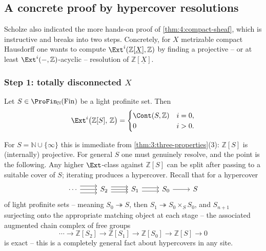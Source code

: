 \subsection{A concrete proof by hypercover resolutions}

Scholze also indicated the more hands-on proof of \cref{thm:4:compact-sheaf},
which is instructive and breaks into two steps. Concretely, for $X$ metrizable
compact Hausdorff one wants to compute $\Ext^{i}(\mathbb{Z}[\underline{X}],
\mathbb{Z})$ by finding a projective -- or at least $\Ext^i(-,\mathbb{Z})$-acyclic
-- resolution of $\mathbb{Z}[\underline{X}]$.

\subsubsection*{Step 1: totally disconnected \texorpdfstring{$X$}{X}}

\begin{proposition}
\label{prop:4:profinite-acyclic}
Let $S\in\ProFin_{\mathbb{N}}(\mathrm{Fin})$ be a light profinite set. Then
\begin{equation*}
\Ext^{i}\bigl(\mathbb{Z}[S],\,\mathbb{Z}\bigr)=
\begin{cases}
\Cont(S,\mathbb{Z}) & i=0,\\
0 & i>0.
\end{cases}
\end{equation*}
\end{proposition}

For $S=\mathbb{N}\cup\{\infty\}$ this is immediate from
\cref{thm:3:three-properties}(3): $\mathbb{Z}[S]$ is (internally) projective. For
general $S$ one must genuinely resolve, and the point is the following. Any
higher $\Ext$-class against $\mathbb{Z}[S]$ can be split after passing to a
suitable cover of $S$; iterating produces a hypercover. Recall that for a
hypercover
\[
\begin{tikzcd}
\cdots \arrow[r, shift left=2] \arrow[r] \arrow[r, shift right=2]
& S_2 \arrow[r, shift left=1.5] \arrow[r] \arrow[r, shift right=1.5]
& S_1 \arrow[r, shift left=1] \arrow[r, shift right=1]
& S_0 \arrow[r]
& S
\end{tikzcd}
\]
of light profinite sets -- meaning $S_0\twoheadrightarrow S$, then
$S_1\twoheadrightarrow S_0\times_S S_0$, and $S_{n+1}$ surjecting onto the
appropriate matching object at each stage -- the associated augmented chain
complex of free groups
\begin{equation}
\label{eq:4:hypercover-chain}
\cdots\to\mathbb{Z}[S_2]\to\mathbb{Z}[S_1]\to\mathbb{Z}[S_0]\to\mathbb{Z}[S]\to0
\end{equation}
is exact -- this is a completely general fact about hypercovers in any site.

